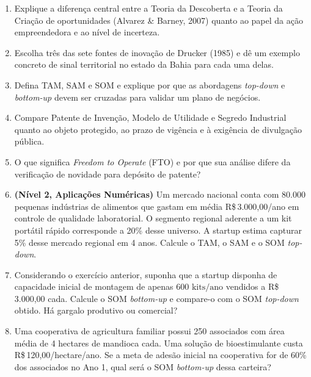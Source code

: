\begin{enumerate}[leftmargin=1.5em, itemsep=6pt]
  \item Explique a diferença central entre a Teoria da Descoberta e a Teoria da Criação de oportunidades (Alvarez \& Barney, 2007) quanto ao papel da ação empreendedora e ao nível de incerteza.
  \espacoResolucao[1.8cm]

  \item Escolha três das sete fontes de inovação de Drucker (1985) e dê um exemplo concreto de sinal territorial no estado da Bahia para cada uma delas.
  \espacoResolucao[1.8cm]

  \item Defina TAM, SAM e SOM e explique por que as abordagens \textit{top-down} e \textit{bottom-up} devem ser cruzadas para validar um plano de negócios.
  \espacoResolucao[1.8cm]

  \item Compare Patente de Invenção, Modelo de Utilidade e Segredo Industrial quanto ao objeto protegido, ao prazo de vigência e à exigência de divulgação pública.
  \espacoResolucao[1.8cm]

  \item O que significa \textit{Freedom to Operate} (FTO) e por que sua análise difere da verificação de novidade para depósito de patente?
  \espacoResolucao[1.8cm]

  \item \textbf{(Nível 2, Aplicações Numéricas)} Um mercado nacional conta com $80.000$ pequenas indústrias de alimentos que gastam em média R\$\,3.000,00/ano em controle de qualidade laboratorial. O segmento regional aderente a um kit portátil rápido corresponde a 20\% desse universo. A startup estima capturar 5\% desse mercado regional em 4 anos. Calcule o TAM, o SAM e o SOM \textit{top-down}.
  \espacoResolucao[2.3cm]

  \item Considerando o exercício anterior, suponha que a startup disponha de capacidade inicial de montagem de apenas $600\text{ kits/ano}$ vendidos a R\$\,3.000,00 cada. Calcule o SOM \textit{bottom-up} e compare-o com o SOM \textit{top-down} obtido. Há gargalo produtivo ou comercial?
  \espacoResolucao[2.3cm]

  \item Uma cooperativa de agricultura familiar possui 250 associados com área média de 4 hectares de mandioca cada. Uma solução de bioestimulante custa R\$\,120,00/hectare/ano. Se a meta de adesão inicial na cooperativa for de 60\% dos associados no Ano 1, qual será o SOM \textit{bottom-up} dessa carteira?
  \espacoResolucao[2.2cm]


\end{enumerate}
